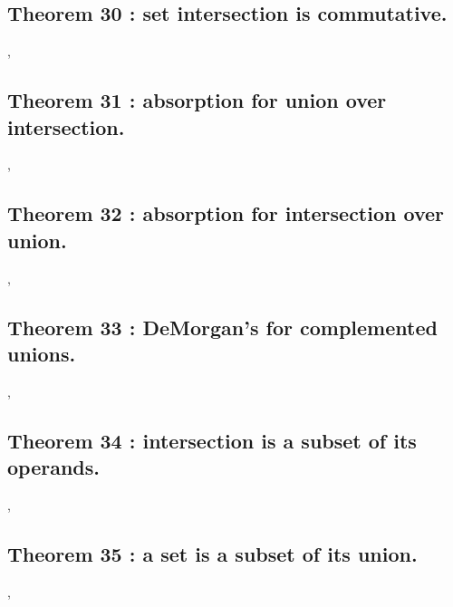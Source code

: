 \documentclass[preview]{standalone}
\begin{document}
\subsection[Set intersection is commutative.]
    {
        \color{section}Theorem 30 \color{black} : set intersection is commutative.
    }

\sep

\subsection[Absorption for union over intersection.]
    {
        \color{section}Theorem 31 \color{black} : absorption for union over intersection.
    }

\sep
\pagebreak


\subsection[Absorption for intersection over union.]
    {
        \color{section}Theorem 32 \color{black} : absorption for intersection over union.
    }

\sep


\subsection[DeMorgan's Law for a complemented union.]
    {
        \color{section}Theorem 33 \color{black} : DeMorgan's for complemented unions.
    }

\sep
\pagebreak


\subsection[Intersection is a subset of its operands.]
    {
        \color{section}Theorem 34 \color{black} : intersection is a subset of its operands.
    }

\sep


\subsection[A set is a subset of its union.]
    {
        \color{section}Theorem 35 \color{black} : a set is a subset of its union.
    }

\sep
\pagebreak
\end{document}
